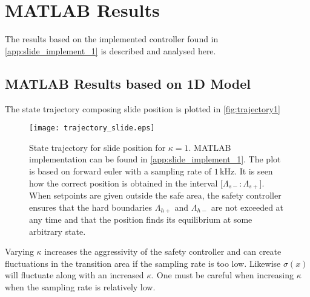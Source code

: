 \section{MATLAB Results}
The results based on the implemented controller found in \autoref{app:slide_implement_1} is described and analysed here. {\color{red}{Udskift alle plots med fs = 1 kHz, det ser fint ud}}
\subsection{MATLAB Results based on 1D Model}
The state trajectory composing slide position is plotted in \autoref{fig:trajectory1}
\begin{figure}[H]
	\center
		\texttt{[image: trajectory\_slide.eps]}
	\caption{State trajectory for slide position for $\kappa=1$. MATLAB implementation can be found in \autoref{app:slide_implement_1}. The plot is based on forward euler with a sampling rate of $1\,$kHz. It is seen how the correct position is obtained in the interval $[\Lambda_{s-}:\Lambda_{s+}$]. When setpoints are given outside the safe area, the safety controller ensures that the hard boundaries $\Lambda_{h+}$ and $\Lambda_{h-}$ are not exceeded at any time and that the position finds its equilibrium at some arbitrary state.}
	\label{fig:trajectory1}
\end{figure}
Varying $\kappa$ increases the aggressivity of the safety controller and can create fluctuations in the transition area if the sampling rate is too low. Likewise $\sigma(x)$ will fluctuate along with an increased $\kappa$. One must be careful when increasing $\kappa$ when the sampling rate is relatively low. %

